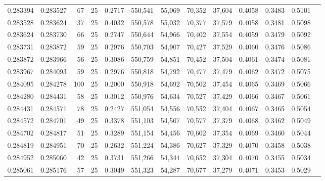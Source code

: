 \begin{tabular}{rrrrrrrrrrrrr}
0.283394 & 0.283527 &    67 &  25 &                                     0.2717 & 550,541 &  55,069 &  70,352 &  37,604 & 0.4058 & 0.3483 & 0.5101 \\
0.283528 & 0.283624 &    37 &  25 &                                     0.4032 & 550,578 &  55,032 &  70,377 &  37,579 & 0.4058 & 0.3481 & 0.5098 \\
0.283624 & 0.283730 &    66 &  25 &                                     0.2747 & 550,644 &  54,966 &  70,402 &  37,554 & 0.4059 & 0.3479 & 0.5092 \\
0.283731 & 0.283872 &    59 &  25 &                                     0.2976 & 550,703 &  54,907 &  70,427 &  37,529 & 0.4060 & 0.3476 & 0.5086 \\
0.283872 & 0.283966 &    56 &  25 &                                     0.3086 & 550,759 &  54,851 &  70,452 &  37,504 & 0.4061 & 0.3474 & 0.5081 \\
0.283967 & 0.284093 &    59 &  25 &                                     0.2976 & 550,818 &  54,792 &  70,477 &  37,479 & 0.4062 & 0.3472 & 0.5075 \\
0.284095 & 0.284278 &   100 &  25 &                                     0.2000 & 550,918 &  54,692 &  70,502 &  37,454 & 0.4065 & 0.3469 & 0.5066 \\
0.284280 & 0.284431 &    58 &  25 &                                     0.3012 & 550,976 &  54,634 &  70,527 &  37,429 & 0.4066 & 0.3467 & 0.5061 \\
0.284431 & 0.284571 &    78 &  25 &                                     0.2427 & 551,054 &  54,556 &  70,552 &  37,404 & 0.4067 & 0.3465 & 0.5054 \\
0.284572 & 0.284701 &    49 &  25 &                                     0.3378 & 551,103 &  54,507 &  70,577 &  37,379 & 0.4068 & 0.3462 & 0.5049 \\
0.284702 & 0.284817 &    51 &  25 &                                     0.3289 & 551,154 &  54,456 &  70,602 &  37,354 & 0.4069 & 0.3460 & 0.5044 \\
0.284819 & 0.284951 &    70 &  25 &                                     0.2632 & 551,224 &  54,386 &  70,627 &  37,329 & 0.4070 & 0.3458 & 0.5038 \\
0.284952 & 0.285060 &    42 &  25 &                                     0.3731 & 551,266 &  54,344 &  70,652 &  37,304 & 0.4070 & 0.3455 & 0.5034 \\
0.285061 & 0.285176 &    57 &  25 &                                     0.3049 & 551,323 &  54,287 &  70,677 &  37,279 & 0.4071 & 0.3453 & 0.5029 \\

\end{tabular}
